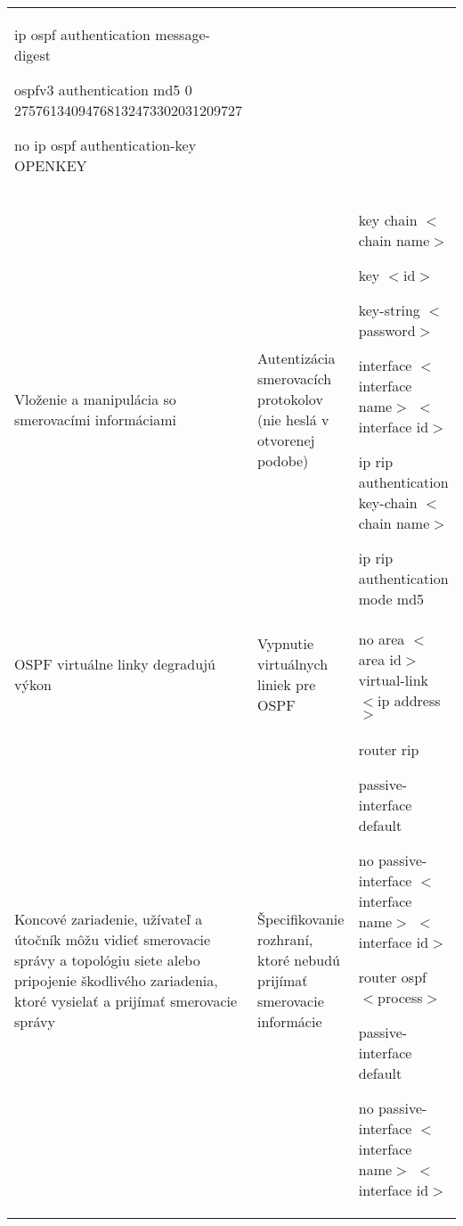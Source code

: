 \begin{longtable}[!htbp]{|L{10em}L{10em}>{\selectfont}L{34em}|}
	\hspace{0.5em}ip ospf authentication message-digest
	
	\hspace{0.5em}ospfv3 authentication md5 0 27576134094768132473302031209727
	
	\hspace{0.5em}no ip ospf authentication-key OPENKEY\\
	
	
	
	
	 Vloženie a manipulácia so smerovacími informáciami	&Autentizácia smerovacích protokolov (nie heslá v otvorenej podobe)	&key chain $<$chain name$>$
	
	\hspace{0.5em}key $<$id$>$
	
	\hspace{1em}key-string $<$password$>$
	
	interface $<$interface name$>$ $<$interface id$>$
	
	\hspace{0.5em}ip rip authentication key-chain $<$chain name$>$
	
	\hspace{0.5em}ip rip authentication mode md5\\
	
	
	
	
	OSPF virtuálne linky degradujú výkon	&Vypnutie virtuálnych liniek pre OSPF	&no area $<$area id$>$ virtual-link $<$ip address$>$\\
	
	
	
	 Koncové zariadenie, užívateľ a útočník môžu vidieť smerovacie správy a topológiu siete alebo pripojenie škodlivého zariadenia, ktoré vysielať a prijímať smerovacie správy	&Špecifikovanie rozhraní, ktoré nebudú prijímať smerovacie informácie	&router rip
	
	\hspace{0.5em}passive-interface default
	
	\hspace{0.5em}no passive-interface $<$interface name$>$ $<$interface id$>$
	
	router ospf $<$process$>$
	
	\hspace{0.5em}passive-interface default
	
	\hspace{0.5em}no passive-interface $<$interface name$>$ $<$interface id$>$
	

\end{longtable}
